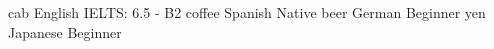 \documentclass[icon]{twentysecondcv}
\begin{document}

\begin{twentyshorticon}
  \twentyitemshorticon
    {cab}
    {English}
    {IELTS: 6.5 - B2}
  \twentyitemshorticon
    {coffee}
    {Spanish}
    {Native}
  \twentyitemshorticon
    {beer}
    {German}
    {Beginner}
  \twentyitemshorticon
    {yen}
    {Japanese}
    {Beginner}
\end{twentyshorticon}


\end{document}

